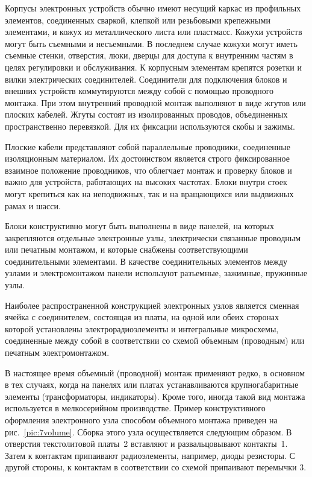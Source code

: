 Корпусы электронных устройств обычно имеют несущий каркас из профильных элементов, соединенных сваркой, клепкой или резьбовыми крепежными элементами, и кожух из металлического листа или пластмасс. Кожухи устройств могут быть съемными и несъемными. В последнем случае кожухи могут иметь съемные стенки, отверстия, люки, дверцы для доступа к внутренним частям в целях регулировки и обслуживания. К корпусным элементам крепятся розетки и вилки электрических соединителей. Соединители для подключения блоков и внешних устройств коммутируются между собой с помощью проводного монтажа. При этом внутренний проводной монтаж выполняют в виде жгутов или плоских кабелей. Жгуты состоят из изолированных проводов, объединенных пространственно перевязкой. Для их фиксации используются скобы и зажимы. 

Плоские кабели представляют собой параллельные проводники, соединенные изоляционным материалом. Их достоинством является строго фиксированное взаимное положение проводников, что облегчает монтаж и проверку блоков и важно для устройств, работающих на высоких частотах. Блоки внутри стоек могут крепиться как на неподвижных, так и на вращающихся или выдвижных рамах и шасси.

Блоки конструктивно могут быть выполнены в виде панелей, на которых закрепляются отдельные электронные узлы, электрически связанные проводным или печатным монтажом, и которые снабжены соответствующими соединительными элементами. В качестве соединительных элементов между узлами и электромонтажом панели используют разъемные, зажимные, пружинные узлы.

Наиболее распространенной конструкцией электронных узлов является сменная ячейка с соединителем, состоящая из платы, на одной или обеих сторонах которой установлены электрорадиоэлементы и интегральные микросхемы, соединенные между собой в соответствии со схемой объемным (проводным) или печатным электромонтажом.

В настоящее время объемный (проводной) монтаж применяют редко, в основном в тех случаях, когда на панелях или платах устанавливаются крупногабаритные элементы (трансформаторы, индикаторы). Кроме того, иногда такой вид монтажа используется в мелкосерийном производстве.
Пример конструктивного оформления электронного узла способом объемного монтажа приведен на рис.~\ref{pic:7volume}. Сборка этого узла осуществляется следующим образом. В отверстия текстолитовой платы~2 вставляют и развальцовывают контакты~1. Затем к контактам припаивают радиоэлементы, например, диоды резисторы. С другой стороны, к контактам в соответствии со схемой припаивают перемычки 3.

